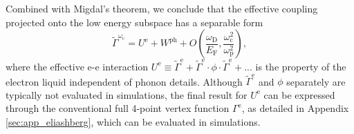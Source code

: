 \documentclass[%
 reprint,
superscriptaddress,
 amsmath,amssymb,
 aps,
prx,
]{revtex4-2}
\newcommand{\Gammapp}{\tilde{\Gamma}}
\newcommand{\txc}{\text{c}}
\newcommand{\txe}{\text{e}}
\newcommand{\txp}{\text{p}}
\newcommand{\txD}{\text{D}}
\newcommand{\txF}{\text{F}}
\newcommand{\txph}{\text{ph}}
\begin{document}


Combined with Migdal's theorem, we conclude that the effective coupling projected onto the low energy subspace has a separable form
\begin{equation}
    \tilde{\Gamma}^{\omega_\txc} = U^\txe +  W^{\txph} + O\left(\frac{\omega_\txD}{E_\txF}, \frac{\omega_\txc^2}{\omega_\txp^2}\right), 
\end{equation}
where the effective e-e interaction $U^\txe \equiv \tilde{\Gamma}^{\txe} + \tilde{\Gamma}^{\txe}\cdot \phi\cdot \tilde{\Gamma}^{\txe} + ...$ is the property of the electron liquid independent of phonon details. Although $\tilde{\Gamma}^{\txe}$ and $\phi$ separately are
typically not evaluated in simulations, the final result for
$U^\txe$ can be expressed through the conventional full 4-point vertex function $\Gamma^{\txe}$, as detailed in Appendix \ref{sec:app_eliashberg}, which can be evaluated in simulations.
\end{document}
